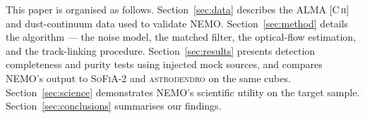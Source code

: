 This paper is organised as follows. Section~\ref{sec:data} describes the ALMA [C\,\textsc{ii}] and dust-continuum data used to validate NEMO. Section~\ref{sec:method} details the algorithm --- the noise model, the matched filter, the optical-flow estimation, and the track-linking procedure. Section~\ref{sec:results} presents detection completeness and purity tests using injected mock sources, and compares NEMO's output to \textsc{SoFiA-2} and \textsc{astrodendro} on the same cubes. Section~\ref{sec:science} demonstrates NEMO's scientific utility on the target sample. Section~\ref{sec:conclusions} summarises our findings.

